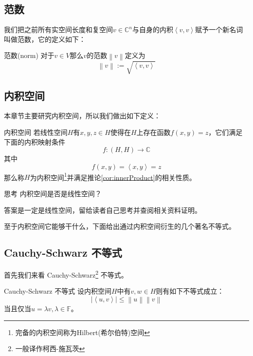 \subsection{范数}

我们把之前所有实空间长度和复空间$v\in \mathbb{C}^n$与自身的内积$\left \langle v,v \right \rangle $赋予一个新名词叫做范数，它的定义如下：

\begin{definition}{范数(norm)}
	对于$v\in V$那么$v$的范数$\left \| v \right \| $定义为$$\left \| v \right \| :=\sqrt{\left \langle v,v \right \rangle }$$
\end{definition}

\subsection{内积空间}

本章节主要研究内积空间，所以我们做出如下定义：

\begin{definition}{内积空间}
	若线性空间$H$有$x,y,z\in H$使得在$H$上存在函数$f(x,y)=z$，它们满足下面的内积映射条件$$f: (H,H)\rightarrow \mathbb{C}$$其中$$f(x,y)=\left \langle x,y \right \rangle =z$$那么称$H$为内积空间\footnote{完备的内积空间称为Hilbert(希尔伯特)空间}并满足推论\ref{cor:innerProduct}的相关性质。
\end{definition}

\begin{ascolorbox1}{思考}
	内积空间是否是线性空间？
\end{ascolorbox1}

答案是一定是线性空间，留给读者自己思考并查阅相关资料证明。

至于内积空间它能够干什么，下面给出通过内积空间衍生的几个著名不等式。

\subsection{Cauchy-Schwarz 不等式}
首先我们来看 Cauchy-Schwarz\footnote{一般译作柯西-施瓦茨} 不等式。

\begin{theorem}{Cauchy-Schwarz 不等式}
	设内积空间$H$中有$v,w\in H$则有如下不等式成立：$$\left | \left \langle u,v \right \rangle  \right | \le \left \| u \right \| \left \| v \right \| $$当且仅当$u=\lambda v,\lambda \in \mathbb{F}$。
\end{theorem}

